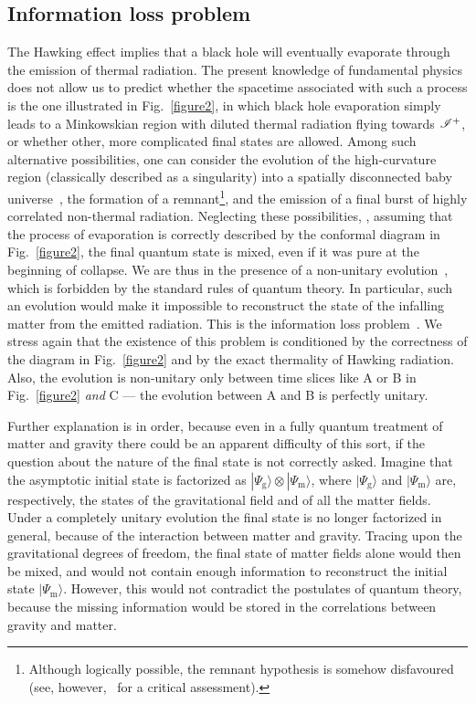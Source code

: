 \documentclass[prd, groupedaddress, showpacs, showkeys, onecolumn, nofootinbib]{revtex4}
\begin{document}
\subsection{Information loss problem}

The Hawking effect implies that a black hole will eventually evaporate through the emission of thermal radiation.  The present knowledge of fundamental physics does not allow us to predict whether the spacetime associated with such a process is the one illustrated in Fig.~\ref{figure2}, in which black hole evaporation simply leads to a Minkowskian region with diluted thermal radiation flying towards $\mathscr{I}^+$, or whether other, more complicated final states are allowed.  Among such alternative possibilities, one can consider the evolution of the high-curvature region (classically described as a singularity) into a spatially disconnected baby universe~\cite{ted-valdivia}, the formation of a remnant\footnote{Although logically possible, the remnant hypothesis is somehow disfavoured~\cite{Giddings:1992hh, Giddings:1993km, Giddings:1993vj} (see, however,~\cite{Hossenfelder:2009xq} for a critical assessment).}, and the emission of a final burst of highly correlated non-thermal radiation.  Neglecting these possibilities, \ie, assuming that the process of evaporation is correctly described by the conformal diagram in Fig.~\ref{figure2}, the final quantum state is mixed, even if it was pure at the beginning of collapse.  We are thus in the presence of a  non-unitary evolution~\cite{Hawking:1976ra, Hawking:1982dj}, which is forbidden by the standard rules of quantum theory.   In particular, such an evolution would make it impossible to reconstruct the state of the infalling matter from the emitted radiation.  This is the information loss problem~\cite{Page:1993up, Giddings:1994zs}.  We stress again that the existence of this problem is conditioned by the correctness of the diagram in Fig.~\ref{figure2} and by the exact thermality of Hawking radiation.  Also, the evolution is non-unitary only between time slices like A or B in Fig.~\ref{figure2} {\em and\/} C --- the evolution between A and B is perfectly unitary.

Further explanation is in order, because even in a fully quantum treatment of matter and gravity there could be an apparent difficulty of this sort, if the question about the nature of the final state is not correctly asked.  Imagine that the asymptotic initial state is factorized as $|\Psi_\mathrm{g}\rangle\otimes |\Psi_\mathrm{m}\rangle$, where $|\Psi_\mathrm{g}\rangle$ and $|\Psi_\mathrm{m}\rangle$ are, respectively, the states of the gravitational field and of all the matter fields.  Under a completely unitary evolution the final state is no longer factorized in general, because of the interaction  between matter and gravity.  Tracing upon the gravitational degrees of freedom, the final state of matter fields alone would then be mixed, and would not contain enough information to reconstruct the initial state $|\Psi_\mathrm{m}\rangle$.  However, this would not contradict the postulates of quantum theory, because the missing information would be stored in the correlations between gravity and matter.
\end{document}
